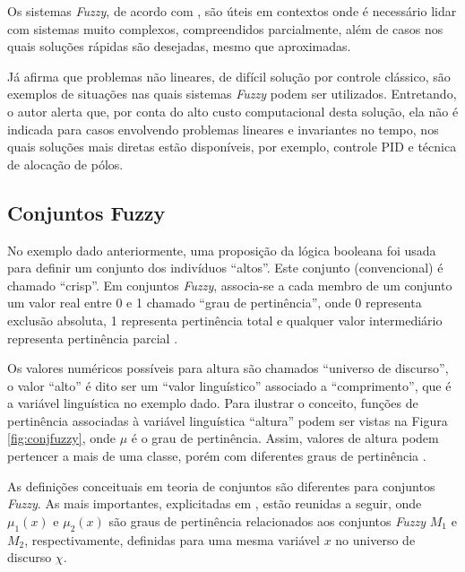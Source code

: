 

Os sistemas \textit{Fuzzy}, de acordo com , são
úteis em contextos onde é necessário lidar com sistemas muito complexos,
compreendidos parcialmente, além de casos nos quais soluções rápidas
são desejadas, mesmo que aproximadas. 

Já  afirma que problemas não lineares, de difícil
solução por controle clássico, são exemplos de situações nas quais sistemas
\textit{Fuzzy} podem ser utilizados. Entretando, o autor alerta que, por conta
do alto custo computacional desta solução, ela não é indicada para casos
envolvendo problemas lineares e invariantes no tempo, nos quais soluções
mais diretas estão disponíveis, por exemplo, controle PID e técnica de alocação
de pólos. 

\subsection{Conjuntos Fuzzy}

No exemplo dado anteriormente, uma proposição da lógica booleana foi usada para
definir um conjunto dos indivíduos ``altos''. Este conjunto (convencional) é
chamado ``crisp''. Em conjuntos \textit{Fuzzy}, associa-se a cada membro de
um conjunto um valor real entre 0 e 1 chamado ``grau de pertinência'', onde 0
representa exclusão absoluta, 1 representa pertinência total e qualquer valor
intermediário representa pertinência parcial \cite{fuzzylilly}. 

Os valores numéricos possíveis para altura são chamados ``universo de
discurso'', o valor ``alto'' é dito ser um ``valor linguístico'' associado a
``comprimento'', que é a variável linguística no exemplo dado. Para ilustrar o
conceito, funções de pertinência associadas à variável linguística ``altura''
podem ser vistas na Figura \ref{fig:conjfuzzy}, onde $\mu$ é o grau de
pertinência. Assim, valores de altura podem pertencer a mais de uma classe,
porém com diferentes graus de pertinência \cite{fuzzylilly}.



As definições conceituais em teoria de conjuntos são diferentes para conjuntos
\textit{Fuzzy}. As mais importantes, explicitadas em ,
estão reunidas a seguir, onde $\mu_1(x)$ e $\mu_2(x)$ são graus de pertinência
relacionados aos conjuntos \textit{Fuzzy} $M_1$ e $M_2$, respectivamente,
definidas para uma mesma variável $x$ no universo de discurso $\chi$.

